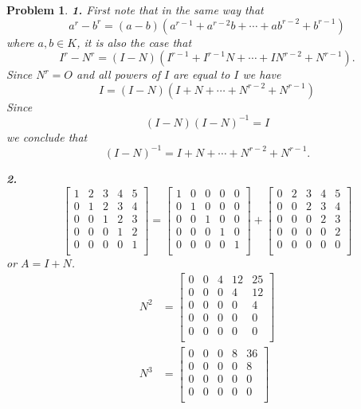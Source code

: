 \documentclass{article}
\newcommand{\subno}[1]{\par\noindent\textbf{#1}}
\theoremstyle{pprop}
\newtheorem{problem}{Problem}[section]
\begin{document}
\begin{problem}
\subno{1.} First note that in the same way that
$$
a^r - b^r =(a-b)(a^{r-1}+ a^{r-2} b + \cdots + a b^{r-2}+ b^{r-1})
$$
where $a,b \in K$, it is also the case that 
$$
I^r - N^r = (I-N)(I^{r-1}+I^{r-1} N  + \cdots + I N^{r-2} + N^{r-1} ).
$$
Since $N^r=O$ and all powers of $I$ are equal to $I$ we have 
$$
I = (I-N)(I+ N +  \cdots +  N^{r-2} + N^{r-1} )
$$
Since
$$
(I-N)(I-N)^{-1}=I
$$
we conclude that
$$
(I-N)^{-1}=I+ N +  \cdots +  N^{r-2} + N^{r-1} .
$$  
\subno{2.}
$$
\begin{bmatrix}
1 & 2 & 3 & 4 & 5 \\
0 & 1 & 2 & 3 & 4 \\
0 & 0 & 1 & 2 & 3 \\
0 & 0 & 0 & 1 & 2 \\
0 & 0 & 0 & 0 & 1 \\
\end{bmatrix}=
\begin{bmatrix}
1 & 0 & 0 & 0 & 0 \\
0 & 1 & 0 & 0 & 0 \\
0 & 0 & 1 & 0 & 0 \\
0 & 0 & 0 & 1 & 0 \\
0 & 0 & 0 & 0 & 1 \\
\end{bmatrix}
+
\begin{bmatrix}
0 & 2 & 3 & 4 & 5 \\
0 & 0 & 2 & 3 & 4 \\
0 & 0 & 0 & 2 & 3 \\
0 & 0 & 0 & 0 & 2 \\
0 & 0 & 0 & 0 & 0 \\
\end{bmatrix}
$$
or $A=I+N$.
\begin{align*}
N^2&=
\begin{bmatrix}
0 & 0 & 4 & 12 & 25 \\
0 & 0 & 0 & 4 & 12 \\
0 & 0 & 0 & 0 & 4 \\
0 & 0 & 0 & 0 & 0 \\
0 & 0 & 0 & 0 & 0 \\
\end{bmatrix} \\
N^3&=
\begin{bmatrix}
0 & 0 & 0 & 8 & 36 \\
0 & 0 & 0 & 0 & 8 \\
0 & 0 & 0 & 0 & 0 \\
0 & 0 & 0 & 0 & 0 \\

\end{bmatrix}
\end{align*}
\end{problem}
\end{document}
